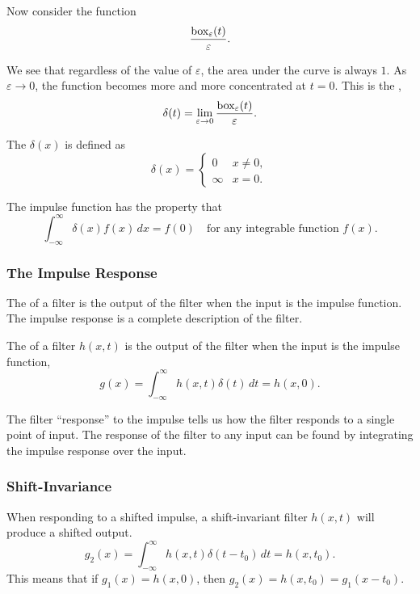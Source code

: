 Now consider the function \[
    \frac{\mathrm{box}_\varepsilon(t)}{\varepsilon}.
\]


We see that regardless of the value of $\varepsilon$, the area under the curve is always $1$. As $\varepsilon \to 0$, the function becomes more and more concentrated at $t = 0$. This is the , \[
    \delta(t) = \lim_{\varepsilon \to 0} \frac{\mathrm{box}_\varepsilon(t)}{\varepsilon}.
\]

\begin{definition}
    The  $\delta(x)$ is defined as \[
        \delta(x) = \begin{cases}
            0      & x \neq 0, \\
            \infty & x = 0.
        \end{cases}
    \]
\end{definition}

The impulse function has the property that \[
    \int_{-\infty}^{\infty} \delta(x) f(x) \, dx = f(0) \quad \text{for any integrable function $f(x)$}.
\]

\subsubsection{The Impulse Response}

The  of a filter is the output of the filter when the input is the impulse function. The impulse response is a complete description of the filter.

\begin{definition}\label{def:impulse-response}
    The  of a filter $h(x, t)$ is the output of the filter when the input is the impulse function, \[
        g(x) = \int_{-\infty}^{\infty} h(x, t) \delta(t) \, dt = h(x, 0).
    \]
\end{definition}

The filter ``response'' to the impulse tells us how the filter responds to a single point of input. The response of the filter to any input can be found by integrating the impulse response over the input.

\subsubsection{Shift-Invariance}

When responding to a shifted impulse, a shift-invariant filter $h(x, t)$ will produce a shifted output. \[
    g_2(x) = \int_{-\infty}^{\infty} h(x, t) \delta(t - t_0) \, dt = h(x, t_0).
\] This means that if $g_1(x) = h(x, 0)$, then $g_2(x) = h(x, t_0) = g_1(x - t_0)$.


